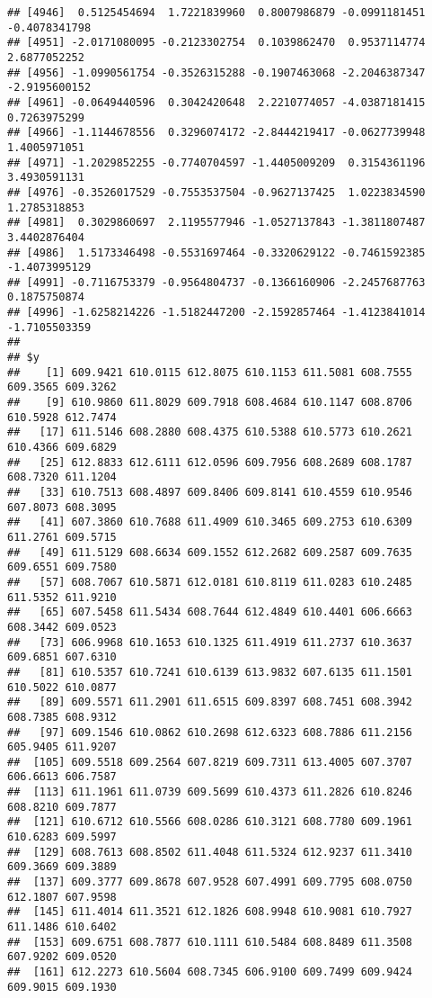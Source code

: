 \documentclass[
]{article}
\begin{document}
\begin{verbatim}
## [4946]  0.5125454694  1.7221839960  0.8007986879 -0.0991181451 -0.4078341798
## [4951] -2.0171080095 -0.2123302754  0.1039862470  0.9537114774  2.6877052252
## [4956] -1.0990561754 -0.3526315288 -0.1907463068 -2.2046387347 -2.9195600152
## [4961] -0.0649440596  0.3042420648  2.2210774057 -4.0387181415  0.7263975299
## [4966] -1.1144678556  0.3296074172 -2.8444219417 -0.0627739948  1.4005971051
## [4971] -1.2029852255 -0.7740704597 -1.4405009209  0.3154361196  3.4930591131
## [4976] -0.3526017529 -0.7553537504 -0.9627137425  1.0223834590  1.2785318853
## [4981]  0.3029860697  2.1195577946 -1.0527137843 -1.3811807487  3.4402876404
## [4986]  1.5173346498 -0.5531697464 -0.3320629122 -0.7461592385 -1.4073995129
## [4991] -0.7116753379 -0.9564804737 -0.1366160906 -2.2457687763  0.1875750874
## [4996] -1.6258214226 -1.5182447200 -2.1592857464 -1.4123841014 -1.7105503359
## 
## $y
##    [1] 609.9421 610.0115 612.8075 610.1153 611.5081 608.7555 609.3565 609.3262
##    [9] 610.9860 611.8029 609.7918 608.4684 610.1147 608.8706 610.5928 612.7474
##   [17] 611.5146 608.2880 608.4375 610.5388 610.5773 610.2621 610.4366 609.6829
##   [25] 612.8833 612.6111 612.0596 609.7956 608.2689 608.1787 608.7320 611.1204
##   [33] 610.7513 608.4897 609.8406 609.8141 610.4559 610.9546 607.8073 608.3095
##   [41] 607.3860 610.7688 611.4909 610.3465 609.2753 610.6309 611.2761 609.5715
##   [49] 611.5129 608.6634 609.1552 612.2682 609.2587 609.7635 609.6551 609.7580
##   [57] 608.7067 610.5871 612.0181 610.8119 611.0283 610.2485 611.5352 611.9210
##   [65] 607.5458 611.5434 608.7644 612.4849 610.4401 606.6663 608.3442 609.0523
##   [73] 606.9968 610.1653 610.1325 611.4919 611.2737 610.3637 609.6851 607.6310
##   [81] 610.5357 610.7241 610.6139 613.9832 607.6135 611.1501 610.5022 610.0877
##   [89] 609.5571 611.2901 611.6515 609.8397 608.7451 608.3942 608.7385 608.9312
##   [97] 609.1546 610.0862 610.2698 612.6323 608.7886 611.2156 605.9405 611.9207
##  [105] 609.5518 609.2564 607.8219 609.7311 613.4005 607.3707 606.6613 606.7587
##  [113] 611.1961 611.0739 609.5699 610.4373 611.2826 610.8246 608.8210 609.7877
##  [121] 610.6712 610.5566 608.0286 610.3121 608.7780 609.1961 610.6283 609.5997
##  [129] 608.7613 608.8502 611.4048 611.5324 612.9237 611.3410 609.3669 609.3889
##  [137] 609.3777 609.8678 607.9528 607.4991 609.7795 608.0750 612.1807 607.9598
##  [145] 611.4014 611.3521 612.1826 608.9948 610.9081 610.7927 611.1486 610.6402
##  [153] 609.6751 608.7877 610.1111 610.5484 608.8489 611.3508 607.9202 609.0520
##  [161] 612.2273 610.5604 608.7345 606.9100 609.7499 609.9424 609.9015 609.1930

\end{verbatim}
\end{document}
